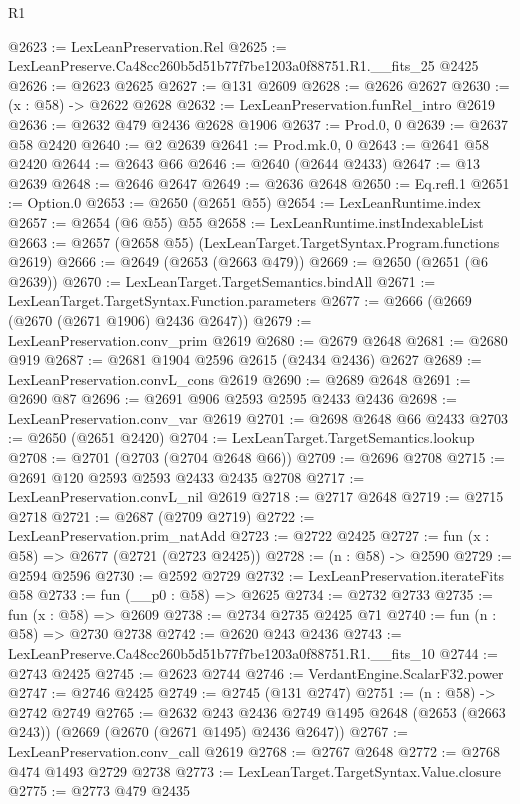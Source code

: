 \begin{lexlean}{R1}
\begin{coremodule}
@2623 := LexLeanPreservation.Rel
@2625 := LexLeanPreserve.Ca48cc260b5d51b77f7be1203a0f88751.R1.__fits_25 @2425
@2626 := @2623 @2625
@2627 := @131 @2609
@2628 := @2626 @2627
@2630 := (x : @58) -> @2622 @2628
@2632 := LexLeanPreservation.funRel_intro @2619
@2636 := @2632 @479 @2436 @2628 @1906
@2637 := Prod.{0, 0}
@2639 := @2637 @58 @2420
@2640 := @2 @2639
@2641 := Prod.mk.{0, 0}
@2643 := @2641 @58 @2420
@2644 := @2643 @66
@2646 := @2640 (@2644 @2433)
@2647 := @13 @2639
@2648 := @2646 @2647
@2649 := @2636 @2648
@2650 := Eq.refl.{1}
@2651 := Option.{0}
@2653 := @2650 (@2651 @55)
@2654 := LexLeanRuntime.index
@2657 := @2654 (@6 @55) @55
@2658 := LexLeanRuntime.instIndexableList
@2663 := @2657 (@2658 @55) (LexLeanTarget.TargetSyntax.Program.functions @2619)
@2666 := @2649 (@2653 (@2663 @479))
@2669 := @2650 (@2651 (@6 @2639))
@2670 := LexLeanTarget.TargetSemantics.bindAll
@2671 := LexLeanTarget.TargetSyntax.Function.parameters
@2677 := @2666 (@2669 (@2670 (@2671 @1906) @2436 @2647))
@2679 := LexLeanPreservation.conv_prim @2619
@2680 := @2679 @2648
@2681 := @2680 @919
@2687 := @2681 @1904 @2596 @2615 (@2434 @2436) @2627
@2689 := LexLeanPreservation.convL_cons @2619
@2690 := @2689 @2648
@2691 := @2690 @87
@2696 := @2691 @906 @2593 @2595 @2433 @2436
@2698 := LexLeanPreservation.conv_var @2619
@2701 := @2698 @2648 @66 @2433
@2703 := @2650 (@2651 @2420)
@2704 := LexLeanTarget.TargetSemantics.lookup
@2708 := @2701 (@2703 (@2704 @2648 @66))
@2709 := @2696 @2708
@2715 := @2691 @120 @2593 @2593 @2433 @2435 @2708
@2717 := LexLeanPreservation.convL_nil @2619
@2718 := @2717 @2648
@2719 := @2715 @2718
@2721 := @2687 (@2709 @2719)
@2722 := LexLeanPreservation.prim_natAdd
@2723 := @2722 @2425
@2727 := fun (x : @58) => @2677 (@2721 (@2723 @2425))
@2728 := (n : @58) -> @2590
@2729 := @2594 @2596
@2730 := @2592 @2729
@2732 := LexLeanPreservation.iterateFits @58
@2733 := fun (__p0 : @58) => @2625
@2734 := @2732 @2733
@2735 := fun (x : @58) => @2609
@2738 := @2734 @2735 @2425 @71
@2740 := fun (n : @58) => @2730 @2738
@2742 := @2620 @243 @2436
@2743 := LexLeanPreserve.Ca48cc260b5d51b77f7be1203a0f88751.R1.__fits_10
@2744 := @2743 @2425
@2745 := @2623 @2744
@2746 := VerdantEngine.ScalarF32.power
@2747 := @2746 @2425
@2749 := @2745 (@131 @2747)
@2751 := (n : @58) -> @2742 @2749
@2765 := @2632
    @243
    @2436
    @2749
    @1495
    @2648
    (@2653 (@2663 @243))
    (@2669 (@2670 (@2671 @1495) @2436 @2647))
@2767 := LexLeanPreservation.conv_call @2619
@2768 := @2767 @2648
@2772 := @2768 @474 @1493 @2729 @2738
@2773 := LexLeanTarget.TargetSyntax.Value.closure
@2775 := @2773 @479 @2435

\end{coremodule}
\end{lexlean}
